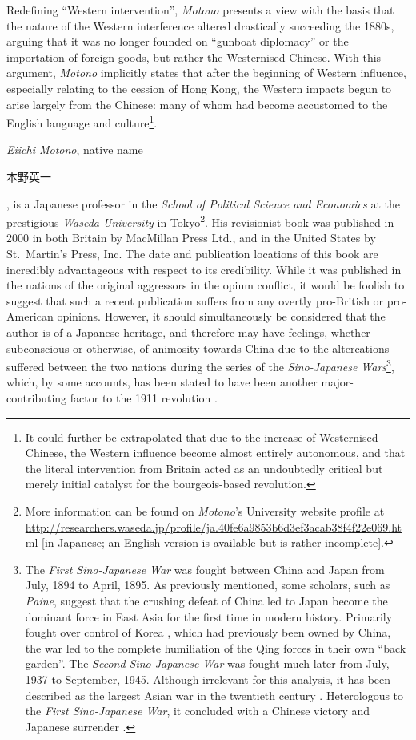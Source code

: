 \documentclass{article}
\newcommand{\jap}[1]{%
        \begin{CJK*}{UTF8}{min}%
                \normalfont%
                #1
        \end{CJK*}
}
\begin{document}
        Redefining ``Western intervention'', \textit{Motono} presents a view with the basis that the nature of the Western interference altered drastically succeeding the 1880s, arguing that it was no longer founded on ``gunboat diplomacy'' or the importation of foreign goods, but rather the Westernised Chinese. With this argument, \textit{Motono} implicitly states that after the beginning of Western influence, especially relating to the cession of Hong Kong, the Western impacts begun to arise largely from the Chinese: many of whom had become accustomed to the English language and culture\footnote{It could further be extrapolated that due to the increase of Westernised Chinese, the Western influence become almost entirely autonomous, and that the literal intervention from Britain acted as an undoubtedly critical but merely initial catalyst for the bourgeois-based revolution.}.

        

        \textit{Eiichi Motono}, native name \jap{本野英一}, is a Japanese professor in the \textit{School of Political Science and Economics} at the prestigious \textit{Waseda University} in Tokyo\footnote{More information can be found on \textit{Motono}'s University website profile at \url{http://researchers.waseda.jp/profile/ja.40fe6a9853b6d3ef3acab38f4f22e069.html} [in Japanese; an English version is available but is rather incomplete].}. His revisionist book was published in 2000 in both Britain by MacMillan Press Ltd., and in the United States by St.\ Martin's Press, Inc. The date and publication locations of this book are incredibly advantageous with respect to its credibility. While it was published in the nations of the original aggressors in the opium conflict, it would be foolish to suggest that such a recent publication suffers from any overtly pro-British or pro-American opinions. However, it should simultaneously be considered that the author is of a Japanese heritage, and therefore may have feelings, whether subconscious or otherwise, of animosity towards China due to the altercations suffered between the two nations during the series of the \textit{Sino-Japanese Wars}\footnote{The \textit{First Sino-Japanese War} was fought between China and Japan from  July, 1894 to  April, 1895. As previously mentioned, some scholars, such as \textit{Paine}, suggest that the crushing defeat of China led to Japan become the dominant force in East Asia for the first time in modern history. Primarily fought over control of Korea \autocite{Olender:2014}, which had previously been owned by China, the war led to the complete humiliation of the Qing forces in their own ``back garden''. The \textit{Second Sino-Japanese War} was fought much later from  July, 1937 to  September, 1945. Although irrelevant for this analysis, it has been described as the largest Asian war in the twentieth century \autocite{Bix:1992}. Heterologous to the \textit{First Sino-Japanese War}, it concluded with a Chinese victory and Japanese surrender \autocite{Kitamura:2014}.}, which, by some accounts, has been stated to have been another major-contributing factor to the 1911 revolution \autocite{Paine:2009}.
\end{document}
